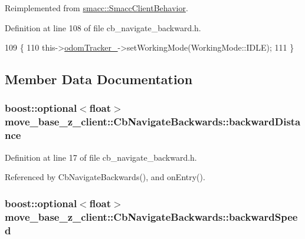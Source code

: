 Reimplemented from \hyperlink{classsmacc_1_1SmaccClientBehavior_ac0cd72d42bd00425362a97c9803ecce5}{smacc\+::\+Smacc\+Client\+Behavior}.



Definition at line 108 of file cb\+\_\+navigate\+\_\+backward.\+h.


\begin{DoxyCode}
109     \{
110         this->\hyperlink{classmove__base__z__client_1_1CbNavigateBackwards_aa8c42828e7dd7e6ac0d7751a8f61c251}{odomTracker\_}->setWorkingMode(WorkingMode::IDLE);
111     \}
\end{DoxyCode}


\subsection{Member Data Documentation}
\subsubsection[{\texorpdfstring{backward\+Distance}{backwardDistance}}]{\setlength{\rightskip}{0pt plus 5cm}boost\+::optional$<$float$>$ move\+\_\+base\+\_\+z\+\_\+client\+::\+Cb\+Navigate\+Backwards\+::backward\+Distance}\hypertarget{classmove__base__z__client_1_1CbNavigateBackwards_a53d06922eff285e4d35f4d7b1b7b7752}{}\label{classmove__base__z__client_1_1CbNavigateBackwards_a53d06922eff285e4d35f4d7b1b7b7752}


Definition at line 17 of file cb\+\_\+navigate\+\_\+backward.\+h.



Referenced by Cb\+Navigate\+Backwards(), and on\+Entry().

\subsubsection[{\texorpdfstring{backward\+Speed}{backwardSpeed}}]{\setlength{\rightskip}{0pt plus 5cm}boost\+::optional$<$float$>$ move\+\_\+base\+\_\+z\+\_\+client\+::\+Cb\+Navigate\+Backwards\+::backward\+Speed}\hypertarget{classmove__base__z__client_1_1CbNavigateBackwards_ad5214ee636b6987d9d1c98458d500b4b}{}\label{classmove__base__z__client_1_1CbNavigateBackwards_ad5214ee636b6987d9d1c98458d500b4b}


